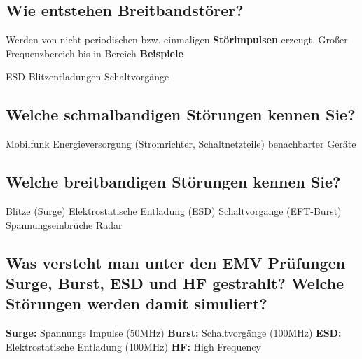 \subsection{Wie entstehen Breitbandstörer?}
Werden von nicht periodischen bzw. einmaligen \textbf{Störimpulsen} erzeugt. Großer Frequenzbereich bis in  Bereich
\textbf{Beispiele}
\begin{outline}
  \1 ESD
  \1 Blitzentladungen
  \1 Schaltvorgänge
\end{outline}

\subsection{Welche schmalbandigen Störungen kennen Sie?}
\begin{outline}
  \1 Mobilfunk
  \1 Energieversorgung (Stromrichter, Schaltnetzteile) benachbarter Geräte
\end{outline}

\subsection{Welche breitbandigen Störungen kennen Sie?}
\begin{outline}
  \1 Blitze (Surge)
  \1 Elektrostatische Entladung (ESD)
  \1 Schaltvorgänge (EFT-Burst)
  \1 Spannungseinbrüche
  \1 Radar
\end{outline}

\subsection{Was versteht man unter den EMV Prüfungen Surge, Burst, ESD und HF gestrahlt? Welche Störungen werden damit simuliert?}
\begin{outline}
  \1 \textbf{Surge:} Spannungs Impulse (50MHz)
  \1 \textbf{Burst:} Schaltvorgänge (100MHz)
  \1 \textbf{ESD:} Elektrostatische Entladung (100MHz)
  \1 \textbf{HF:} High Frequency
\end{outline}

